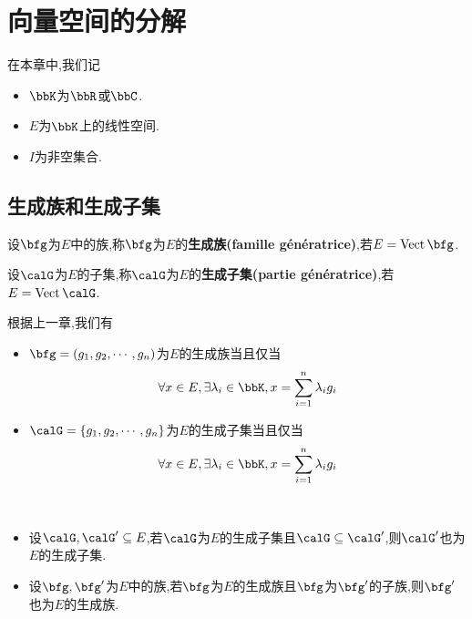 \chapter{向量空间的分解}

在本章中,我们记
\begin{itemize}
    \item $\bbK$为$\bbR$或$\bbC$.
    \item $E$为$\bbK$上的线性空间.
    \item $I$为非空集合.
\end{itemize}

\section{生成族和生成子集}

\begin{deff}
    设$\bfg$为$E$中的族,称$\bfg$为$E$的\textbf{生成族(famille génératrice)},若$E = \vect \bfg$.
\end{deff}

\begin{deff}
    设$\calG$为$E$的子集,称$\calG$为$E$的\textbf{生成子集(partie génératrice)},若$E = \vect \calG$.
\end{deff}

\begin{rqq}
    根据上一章,我们有
    \begin{itemize}
        \item $\bfg = (g_1, g_2, \cdots, g_n)$为$E$的生成族当且仅当
            \[ \forall x \in E, \exists \lambda_i \in \bbK, x = \sum\limits_{i = 1}^n \lambda_i g_i \]
        \item $\calG = \{ g_1, g_2, \cdots, g_n \}$为$E$的生成子集当且仅当
            \[ \forall x \in E, \exists \lambda_i \in \bbK, x = \sum\limits_{i = 1}^n \lambda_i g_i \]
    \end{itemize}
\end{rqq}

\begin{prop} $\ $
    \begin{itemize}
        \item 设$\calG, \calG' \subseteq E$,若$\calG$为$E$的生成子集且$\calG \subseteq \calG'$,则$\calG'$也为$E$的生成子集.
        \item 设$\bfg, \bfg'$为$E$中的族,若$\bfg$为$E$的生成族且$\bfg$为$\bfg'$的子族,则$\bfg'$也为$E$的生成族.
    \end{itemize}
\end{prop}

